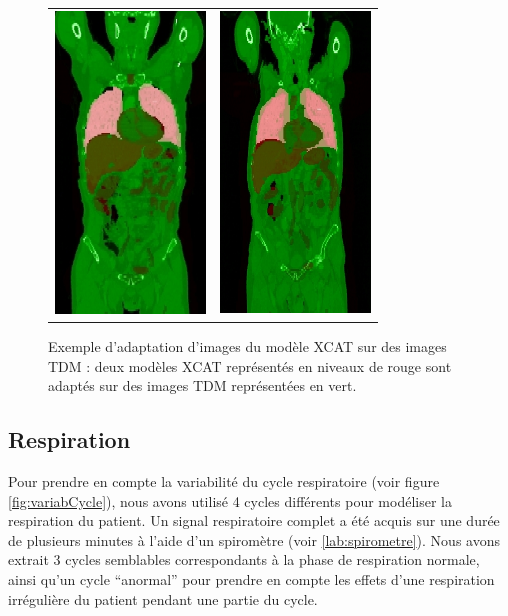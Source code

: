\begin{figure}
 \centering
 \begin{tabular}{c c}
 \includegraphics[width=4cm]{images/adapt_bru_jea} &
 \includegraphics[width=4cm]{images/adapt_cha_chr}
 \end{tabular}
 \caption[Exemple d’adaptation d’images du modèle XCAT sur des images TDM]{ Exemple d’adaptation d’images du modèle XCAT sur des images TDM : deux modèles XCAT représentés en niveaux de rouge sont adaptés sur des images TDM représentées en vert.}
 \label{fig:adaptXCAT}
\end{figure}


		\subsection{Respiration}


Pour prendre en compte la variabilité du cycle respiratoire (voir figure \ref{fig:variabCycle}), nous avons utilisé 4 cycles différents pour modéliser la respiration du patient. Un signal respiratoire complet a été acquis sur une durée de plusieurs minutes à l'aide d'un spiromètre (voir \ref{lab:spirometre}). Nous avons extrait 3 cycles semblables correspondants à la phase de respiration normale, ainsi qu'un cycle ``anormal'' pour prendre en compte les effets d'une respiration irrégulière du patient pendant une partie du cycle.

